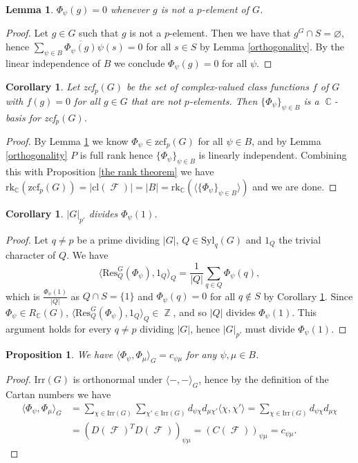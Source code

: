\documentclass[12pt]{article}
\DeclareMathOperator{\C}{\mathbb{C}}
\DeclareMathOperator{\Z}{\mathbb{Z}}
\DeclareMathOperator{\sF}{\mathcal{F}}
\theoremstyle{plain}
\newtheorem{prop}[thm]{Proposition}
\newtheorem{cor}[thm]{Corollary}
\newtheorem{lem}[thm]{Lemma}
\theoremstyle{definition}
\begin{document}
\begin{lem}\label{zcf}
$\Phi_{\psi}(g) = 0$ whenever $g$ is not a $p$-element of $G$.
\end{lem}
\begin{proof}
Let $g \in G$ such that $g$ is not a $p$-element. 
Then we have that $g^G \cap S = \varnothing$, hence $\sum_{\psi \in B} \overline{\Phi_{\psi}(g)}\psi(s) = 0$ for all $s \in S$ by Lemma \ref{orthogonality}. 
By the linear independence of $B$ we conclude $\Phi_{\psi}(g) = 0$ for all $\psi$. 
\end{proof}
\begin{cor}\label{zcf basis} Let zcf$_p(G)$ be the set of complex-valued class functions $f$ of $G$ with $f(g) = 0$ for all $g \in G$ that are not $p$-elements. Then $\{\Phi_{\psi}\}_{\psi \in B}$ is a $\C$-basis for zcf$_p(G)$. \end{cor}
\begin{proof}
By Lemma \ref{zcf} we know $\Phi_{\psi} \in \text{zcf}_p(G)$ for all $\psi \in B$, and by Lemma \ref{orthogonality} $P$ is full rank hence $\{\Phi_{\psi}\}_{\psi \in B}$ is linearly independent. 
Combining this with Proposition \ref{the rank theorem} we have $\text{rk}_{\C}(\text{zcf}_p(G)) = |\text{cl}(\sF)| = |B| = \text{rk}_{\C}(\langle \{\Phi_{\psi}\}_{\psi \in B} \rangle)$ and we are done.
\end{proof}

\begin{cor}\label{cor 3.6} $|G|_{p'}$ divides $\Phi_{\psi}(1)$. \end{cor}
\begin{proof}
Let $q \neq p$ be a prime dividing $|G|$,  $Q \in \mathrm{Syl}_q(G)$ and $1_Q$ the trivial character of $Q$. We have 
\[\langle \mathrm{Res}^G_Q(\Phi_{\psi}), 1_Q \rangle_Q = \frac{1}{|Q|}\sum_{q \in Q} \Phi_{\psi}(q),\]
which is $\frac{\Phi_{\psi}(1)}{|Q|}$ as $Q \cap S = \{1\}$ and $\Phi_{\psi}(q) = 0$ for all $q \not \in S$ by Corollary \ref{zcf}. 
Since $\Phi_{\psi} \in R_{\C}(G)$, $\langle \mathrm{Res}_Q^G(\Phi_{\psi}), 1_Q\rangle_Q \in \Z$, and so $|Q|$ divides $\Phi_{\psi}(1)$. This argument holds for every $q \neq p$ dividing $|G|$, hence $|G|_{p'}$ must divide $\Phi_{\psi}(1)$.
\end{proof}

\begin{prop}\label{oths inner product}
We have  $\langle \Phi_{\psi}, \Phi_{\mu} \rangle_G = c_{\psi\mu}$ for any $\psi, \mu \in B$.
\end{prop}
\begin{proof}
$\text{Irr}(G)$ is orthonormal under $\langle -,- \rangle_G$, hence by the definition of the Cartan numbers we have
\begin{align*}
 \langle \Phi_{\psi}, \Phi_{\mu} \rangle_G &= \sum_{\chi \in \mathrm{Irr}(G)}\sum_{\chi' \in \mathrm{Irr}(G)}d_{\psi\chi}d_{\mu\chi'}\langle \chi, \chi' \rangle = \sum_{\chi \in \mathrm{Irr}(G)} d_{\psi\chi}d_{\mu\chi} 
\\ &= (D(\sF)^TD(\sF))_{\psi\mu} = (C(\sF))_{\psi\mu} = c_{\psi\mu}.
\end{align*}
\end{proof}
\end{document}
